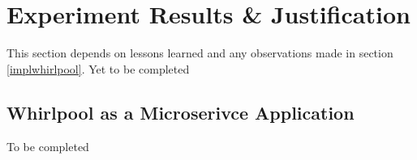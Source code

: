 \chapter{Experiment Results \& Justification}
This section depends on lessons learned and any observations made in section
\ref{implwhirlpool}. Yet to be completed

\section{Whirlpool as a Microserivce Application}
To be completed